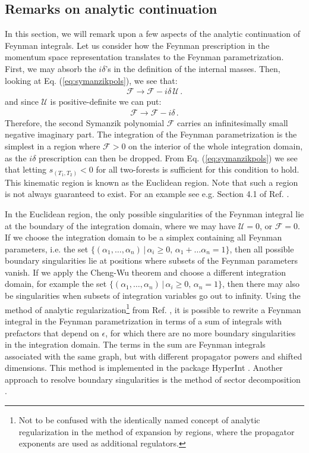 \documentclass{article}
\begin{document}
\subsection{Remarks on analytic continuation}
\label{sec:analyticcontinuationremarks}
In this section, we will remark upon a few aspects of the analytic continuation of Feynman integrals. Let us consider how the Feynman prescription in the momentum space representation translates to the Feynman parametrization. First, we may absorb the $i\delta$'s in the definition of the internal masses. Then, looking at Eq. (\ref{eq:symanzikpols}), we see that:
\begin{align}
    \mathcal{F} \rightarrow \mathcal{F} - i\delta\, \mathcal{U}\,.
\end{align}
and since $\mathcal{U}$ is positive-definite we can put:
\begin{align}
    \label{eq:Fidelta}
    \mathcal{F} \rightarrow \mathcal{F} - i\delta\,.
\end{align}
Therefore, the second Symanzik polynomial $\mathcal{F}$ carries an infinitesimally small negative imaginary part. The integration of the Feynman parametrization is the simplest in a region where $\mathcal{F} > 0$ on the interior of the whole integration domain, as the $i\delta$ prescription can then be dropped. From Eq. (\ref{eq:symanzikpols}) we see that letting $s_{(T_1,T_2)}<0$ for all two-forests is sufficient for this condition to hold. This kinematic region is known as the Euclidean region. Note that such a region is not always guaranteed to exist. For an example see e.g. Section 4.1 of Ref. \cite{Henn:2013nsa}.

In the Euclidean region, the only possible singularities of the Feynman integral lie at the boundary of the integration domain, where we may have $\mathcal{U} = 0$, or $\mathcal{F} = 0$.  If we choose the integration domain to be a simplex containing all Feynman parameters, i.e. the set $\{(\alpha_1,\ldots,\alpha_n)\,|\,\alpha_i \geq 0,\,\alpha_1 + \ldots \alpha_n = 1\}$, then all possible boundary singularities lie at positions where subsets of the Feynman parameters vanish. If we apply the Cheng-Wu theorem and choose a different integration domain, for example the set $\{(\alpha_1,\ldots,\alpha_n)\,|\, \alpha_i \geq 0,\, \alpha_n = 1\}$, then there may also be singularities when subsets of integration variables go out to infinity. Using the method of analytic regularization\footnote{Not to be confused with the identically named concept of analytic regularization in the method of expansion by regions, where the propagator exponents are used as additional regulators.} from Ref. \cite{Panzer:2014gra}, it is possible to rewrite a Feynman integral in the Feynman parametrization in terms of a sum of integrals with prefactors that depend on $\epsilon$, for which there are no more boundary singularities in the integration domain. The terms in the sum are Feynman integrals associated with the same graph, but with different propagator powers and shifted dimensions. This method is implemented in the package HyperInt \cite{Panzer:2014caa}. Another approach to resolve boundary singularities is the method of sector decomposition \cite{Binoth:2000ps, Binoth:2003ak, Bogner:2007cr}.
\end{document}
